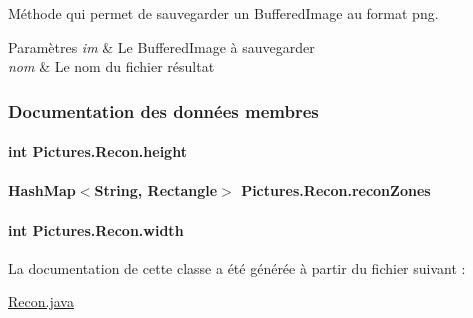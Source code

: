 Méthode qui permet de sauvegarder un Buffered\+Image au format png. 


\begin{DoxyParams}{Paramètres}
{\em im} & Le Buffered\+Image à sauvegarder \\
\hline
{\em nom} & Le nom du fichier résultat \\
\hline
\end{DoxyParams}


\subsubsection{Documentation des données membres}
\hypertarget{classPictures_1_1Recon_aed3f893251cf156b4764d5110c1e481f}{}
\paragraph[{height}]{\setlength{\rightskip}{0pt plus 5cm}int Pictures.\+Recon.\+height\hspace{0.3cm}{\ttfamily [private]}}\label{classPictures_1_1Recon_aed3f893251cf156b4764d5110c1e481f}
\hypertarget{classPictures_1_1Recon_afb1e063949789c0e3a1bc52a70b1afd9}{}
\paragraph[{recon\+Zones}]{\setlength{\rightskip}{0pt plus 5cm}Hash\+Map$<$String, Rectangle$>$ Pictures.\+Recon.\+recon\+Zones\hspace{0.3cm}{\ttfamily [private]}}\label{classPictures_1_1Recon_afb1e063949789c0e3a1bc52a70b1afd9}
\hypertarget{classPictures_1_1Recon_a3206c6aac74a4f37fb29176a3c8f7d2a}{}
\paragraph[{width}]{\setlength{\rightskip}{0pt plus 5cm}int Pictures.\+Recon.\+width\hspace{0.3cm}{\ttfamily [package]}}\label{classPictures_1_1Recon_a3206c6aac74a4f37fb29176a3c8f7d2a}


La documentation de cette classe a été générée à partir du fichier suivant \+:\begin{DoxyCompactItemize}
\item 
\hyperlink{Recon_8java}{Recon.\+java}\end{DoxyCompactItemize}

